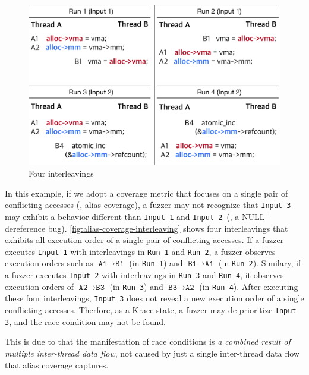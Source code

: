 \begin{figure}[t]
  \centering
  \includegraphics[width=0.9\linewidth]{fig/alias-coverage-interleaving.pdf}
  \caption{Four interleavings }
  \label{fig:alias-coverage-interleaving}
\end{figure}

In this example, if we adopt a coverage metric that focuses on a
single pair of conflicting accesses (\eg, alias coverage), a fuzzer
may not recognize that \texttt{Input 3} may exhibit a behavior
different than \texttt{Input 1} and \texttt{Input 2}~(\ie, a
NULL-dereference bug).
%
\autoref{fig:alias-coverage-interleaving} shows four interleavings
that exhibits all execution order of a single pair of conflicting
accesses. If a fuzzer executes \texttt{Input 1} with interleavings in
\texttt{Run 1} and \texttt{Run 2}, a fuzzer observes execution orders
such as $\texttt{A1} \rightarrow \texttt{B1}$ (in \texttt{Run 1}) and
$\texttt{B1} \rightarrow \texttt{A1}$ (in \texttt{Run 2}).
%
Similary, if a fuzzer executes \texttt{Input 2} with interleavings in
\texttt{Run 3} and \texttt{Run 4}, it observes execution orders of
$\texttt{A2} \rightarrow \texttt{B3}$ (in \texttt{Run 3}) and
$\texttt{B3} \rightarrow \texttt{A2}$ (in \texttt{Run 4}).
%
After executing these four interleavings, \texttt{Input 3} does not
reveal a new execution order of a single conflicting
accesses. Therfore, as a Krace state, a fuzzer may de-prioritize
\texttt{Input 3}, and the race condition may not be found.

% 
This is due to that the manifestation of race conditions is \textit{a
  combined result of multiple inter-thread data flow}, not caused by
just a single inter-thread data flow that alias coverage captures.


